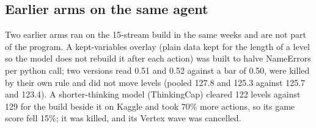 \subsection{Earlier arms on the same agent}

Two earlier arms ran on the 15-stream build in the same weeks and are not part of the program. A kept-variables overlay (plain data kept for the length of a level so the model does not rebuild it after each action) was built to halve NameErrors per python call; two versions read 0.51 and 0.52 against a bar of 0.50, were killed by their own rule and did not move levels (pooled 127.8 and 125.3 against 125.7 and 123.4). %
A shorter-thinking model (ThinkingCap) cleared 122 levels against 129 for the build beside it on Kaggle and took 70\% more actions, so its game score fell 15\%; it was killed, and its Vertex wave was cancelled. %
